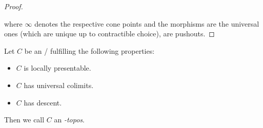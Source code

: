\begin{lemma}
\begin{proof}
\begin{center}
        \end{center}
        where $\infty$ denotes the respective cone points and the morphisms are the universal ones (which are unique up to contractible choice), are pushouts.
    \end{proof}
\end{lemma}
\begin{lemma}
    
\end{lemma}
\begin{definition}
    Let $C$ be an \inftycat/ fulfilling the following properties:
    \begin{itemize}
        \item $C$ is locally presentable.
        \item $C$ has universal colimits.
        \item $C$ has descent.
    \end{itemize}
    Then we call $C$ an \emph{\infty-topos}.
\end{definition}